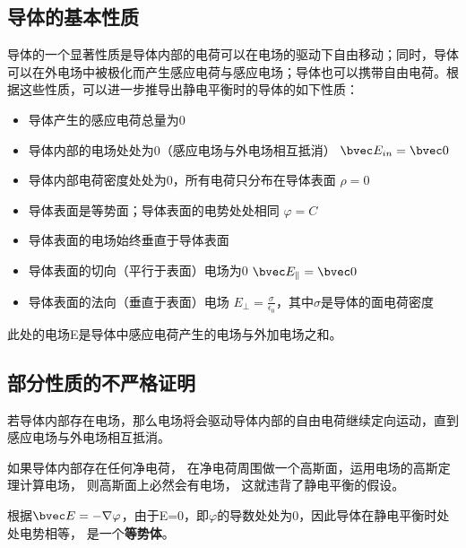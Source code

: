 
\begin{issues}
\end{issues}


\subsection{导体的基本性质}
导体的一个显著性质是导体内部的电荷可以在电场的驱动下自由移动；同时，导体可以在外电场中被极化而产生感应电荷与感应电场；导体也可以携带自由电荷。根据这些性质，可以进一步推导出静电平衡时的导体的如下性质\cite{GriffE}：

\begin{itemize}
\item 导体产生的感应电荷总量为0 
\item 导体内部的电场处处为0（感应电场与外电场相互抵消） $\bvec E_{in} = \bvec 0$
\item 导体内部电荷密度处处为0，所有电荷只分布在导体表面 $\rho=0$
\item 导体表面是等势面；导体表面的电势处处相同 $\varphi=C$
\item 导体表面的电场始终垂直于导体表面
\item 导体表面的切向（平行于表面）电场为0 $\bvec E_\parallel = \bvec 0$
\item 导体表面的法向（垂直于表面）电场 $E_\perp = \frac{\sigma}{\epsilon_0}$，其中$\sigma$是导体的面电荷密度
\end{itemize}

此处的电场E是导体中感应电荷产生的电场与外加电场之和。

\subsection{部分性质的不严格证明}
若导体内部存在电场，那么电场将会驱动导体内部的自由电荷继续定向运动，直到感应电场与外电场相互抵消。

如果导体内部存在任何净电荷， 在净电荷周围做一个高斯面，运用电场的高斯定理计算电场， 则高斯面上必然会有电场， 这就违背了静电平衡的假设。

根据$\bvec E=-\nabla\varphi$，由于E=0，即$\varphi$的导数处处为0，因此导体在静电平衡时处处电势相等， 是一个\textbf{等势体}。
\cite{GriffE}

